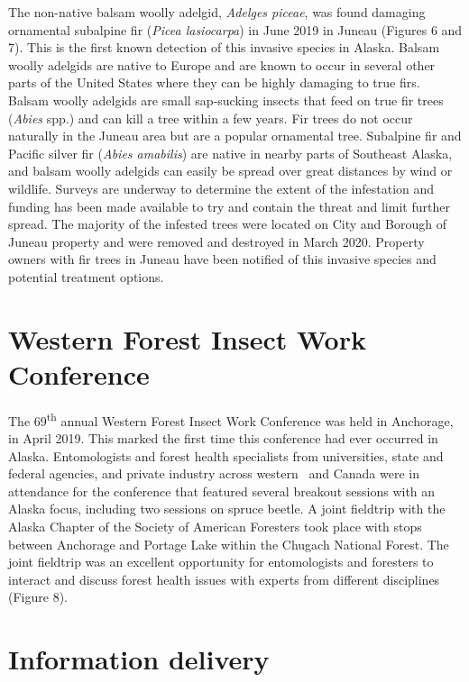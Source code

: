 The non-native balsam woolly adelgid, \textit{Adelges piceae}, was found damaging ornamental subalpine fir (\textit{Picea lasiocarpa}) in June 2019 in Juneau (Figures 6 and 7). This is the first known detection of this invasive species in Alaska. Balsam woolly adelgids are native to Europe and are known to occur in several other parts of the United States where they can be highly damaging to true firs. Balsam woolly adelgids are small sap-sucking insects that feed on true fir trees (\textit{Abies} spp.) and can kill a tree within a few years. Fir trees do not occur naturally in the Juneau area but are a popular ornamental tree. Subalpine fir and Pacific silver fir (\textit{Abies amabilis})  are native in nearby parts of Southeast Alaska, and balsam woolly adelgids can easily be spread over great distances by wind or wildlife. Surveys are underway to determine the extent of the infestation and funding has been made available to try and contain the threat and limit further spread.  The majority of the infested trees were located on City and Borough of Juneau property and were removed and destroyed in March 2020.  Property owners with fir trees in Juneau have been notified of this invasive species and potential treatment options. 
 
\section{Western Forest Insect Work Conference}

The 69\textsuperscript{th} annual Western Forest Insect Work Conference was held in Anchorage,  in April 2019. This marked the first time this conference had ever occurred in Alaska. Entomologists and forest health specialists from universities, state and federal agencies, and private industry across western \ and Canada were in attendance for the conference that featured several breakout sessions with an Alaska focus, including two sessions on spruce beetle. A joint fieldtrip with the Alaska Chapter of the Society of American Foresters took place with stops between Anchorage and Portage Lake within the Chugach National Forest. The joint fieldtrip was an excellent opportunity for entomologists and foresters to interact and discuss forest health issues with experts from different disciplines (Figure 8).

\section{Information delivery}

